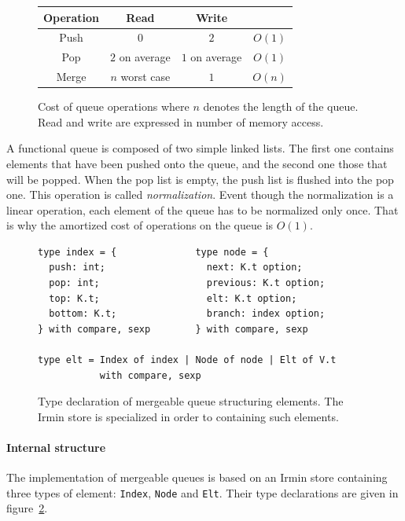 \documentclass{article}
\newcommand{\irmin}{Irmin\xspace}
\newcommand{\code}[1]{\texttt{#1}}
\begin{document}
\begin{figure}[hbt]
\centering
\setlength{\tabcolsep}{0.5cm}
\begin{tabular}{|c|c|c|c|}
\hline
	Operation &
	Read &
	Write &
	\\
\hline
	Push &
	\cellcolor{chameleon!20} $0$ &
	\cellcolor{chameleon!20} $2$ &
	\cellcolor{chameleon!20} $O(1)$ \\
\hline
	Pop &
	\cellcolor{butter!20} $2$ on average &
	\cellcolor{butter!20} $1$ on average &
	\cellcolor{chameleon!20} $O(1)$ \\
\hline
\hline
	Merge &
	\cellcolor{scarletred!20} $n$ worst case &
	\cellcolor{chameleon!20} $1$ &
	\cellcolor{butter!20} $O(n)$ \\
\hline
\end{tabular}
\caption{Cost of queue operations where $n$ denotes the length of the queue. Read and write are expressed in number of memory access.}
\label{queuetable}
\end{figure}

A functional queue is composed of two simple linked lists.
The first one contains elements that have been pushed onto the queue, and the second one those that will be popped.
When the pop list is empty, the push list is flushed into the pop one.
This operation is called \emph{normalization}.
Event though the normalization is a linear operation,  each element of the queue has to be normalized only once.
That is why the amortized cost of operations on the queue is $O(1)$.

\begin{figure}[hbt]
\begin{lstlisting}
type index = {              type node = {
  push: int;                  next: K.t option;
  pop: int;                   previous: K.t option;
  top: K.t;                   elt: K.t option;
  bottom: K.t;                branch: index option;
} with compare, sexp        } with compare, sexp

type elt = Index of index | Node of node | Elt of V.t
           with compare, sexp
\end{lstlisting}
\caption{Type declaration of mergeable queue structuring elements. The \irmin store is specialized in order to containing such elements.}
\label{queuesig}
\end{figure}

\paragraph{Internal structure}
The implementation of mergeable queues is based on an \irmin store containing three types of element: \code{Index}, \code{Node} and \code{Elt}. Their type declarations are given in figure~\ref{queuesig}.
\end{document}
